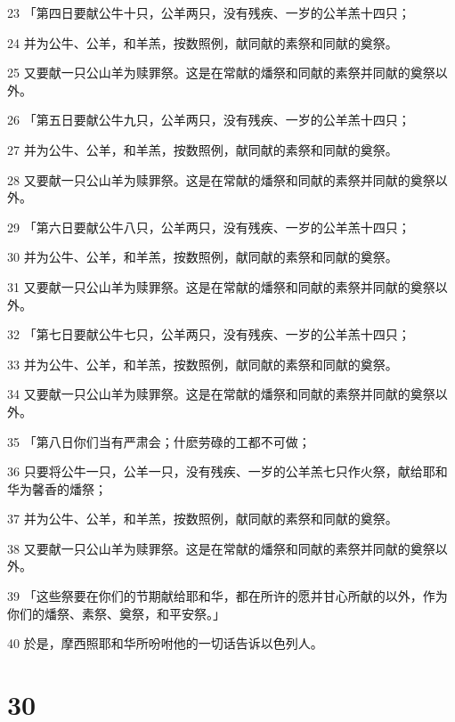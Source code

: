\par 23 「第四日要献公牛十只，公羊两只，没有残疾、一岁的公羊羔十四只；
\par 24 并为公牛、公羊，和羊羔，按数照例，献同献的素祭和同献的奠祭。
\par 25 又要献一只公山羊为赎罪祭。这是在常献的燔祭和同献的素祭并同献的奠祭以外。
\par 26 「第五日要献公牛九只，公羊两只，没有残疾、一岁的公羊羔十四只；
\par 27 并为公牛、公羊，和羊羔，按数照例，献同献的素祭和同献的奠祭。
\par 28 又要献一只公山羊为赎罪祭。这是在常献的燔祭和同献的素祭并同献的奠祭以外。
\par 29 「第六日要献公牛八只，公羊两只，没有残疾、一岁的公羊羔十四只；
\par 30 并为公牛、公羊，和羊羔，按数照例，献同献的素祭和同献的奠祭。
\par 31 又要献一只公山羊为赎罪祭。这是在常献的燔祭和同献的素祭并同献的奠祭以外。
\par 32 「第七日要献公牛七只，公羊两只，没有残疾、一岁的公羊羔十四只；
\par 33 并为公牛、公羊，和羊羔，按数照例，献同献的素祭和同献的奠祭。
\par 34 又要献一只公山羊为赎罪祭。这是在常献的燔祭和同献的素祭并同献的奠祭以外。
\par 35 「第八日你们当有严肃会；什麽劳碌的工都不可做；
\par 36 只要将公牛一只，公羊一只，没有残疾、一岁的公羊羔七只作火祭，献给耶和华为馨香的燔祭；
\par 37 并为公牛、公羊，和羊羔，按数照例，献同献的素祭和同献的奠祭。
\par 38 又要献一只公山羊为赎罪祭。这是在常献的燔祭和同献的素祭并同献的奠祭以外。
\par 39 「这些祭要在你们的节期献给耶和华，都在所许的愿并甘心所献的以外，作为你们的燔祭、素祭、奠祭，和平安祭。」
\par 40 於是，摩西照耶和华所吩咐他的一切话告诉以色列人。

\chapter{30}

